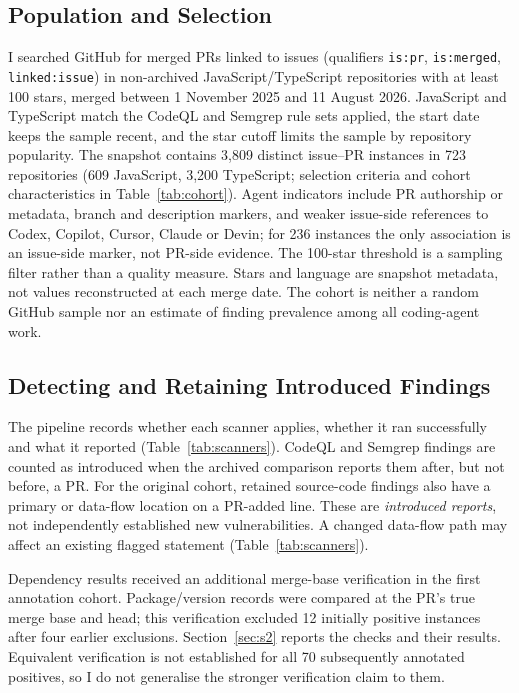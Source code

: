 \documentclass[acmsmall,screen,nonacm]{acmart}
\begin{document}
\subsection{Population and Selection}

I searched GitHub for merged PRs linked to issues (qualifiers \texttt{is:pr}, \texttt{is:merged}, \texttt{linked:issue}) in non-archived JavaScript/\allowbreak TypeScript repositories with at least 100 stars, merged between 1 November 2025 and 11 August 2026. JavaScript and TypeScript match the CodeQL and Semgrep rule sets applied, the start date keeps the sample recent, and the star cutoff limits the sample by repository popularity. The snapshot contains 3,809 distinct issue--PR instances in 723 repositories (609 JavaScript, 3,200 TypeScript; selection criteria and cohort characteristics in Table~\ref{tab:cohort}). Agent indicators include PR authorship or metadata, branch and description markers, and weaker issue-side references to Codex, Copilot, Cursor, Claude or Devin; for 236 instances the only association is an issue-side marker, not PR-side evidence. The 100-star threshold is a sampling filter rather than a quality measure. Stars and language are snapshot metadata, not values reconstructed at each merge date. The cohort is neither a random GitHub sample nor an estimate of finding prevalence among all coding-agent work.

\subsection{Detecting and Retaining Introduced Findings}

The pipeline records whether each scanner applies, whether it ran successfully and what it reported (Table~\ref{tab:scanners}). CodeQL and Semgrep findings are counted as introduced when the archived comparison reports them after, but not before, a PR. For the original cohort, retained source-code findings also have a primary or data-flow location on a PR-added line. These are \emph{introduced reports}, not independently established new vulnerabilities. A changed data-flow path may affect an existing flagged statement (Table~\ref{tab:scanners}).

Dependency results received an additional merge-base verification in the first annotation cohort. Package/version records were compared at the PR's true merge base and head; this verification excluded 12 initially positive instances after four earlier exclusions. Section~\ref{sec:s2} reports the checks and their results. Equivalent verification is not established for all 70 subsequently annotated positives, so I do not generalise the stronger verification claim to them.
\end{document}
